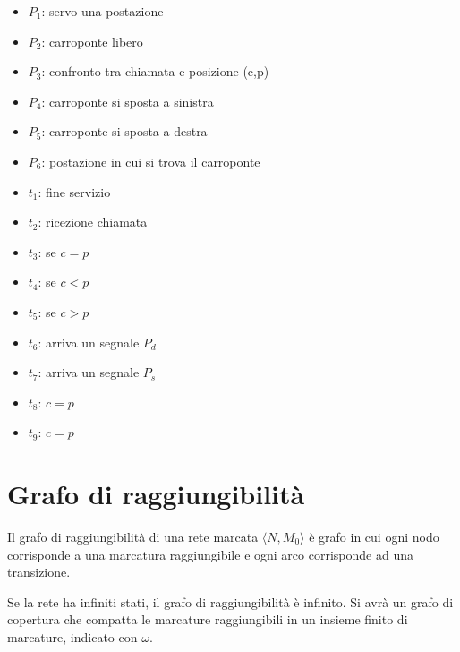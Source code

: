 \documentclass[a4paper]{report}
\begin{document}
\begin{itemize}
\item $P_1$: servo una postazione
\item $P_2$: carroponte libero
\item $P_3$: confronto tra chiamata e posizione (c,p)
\item $P_4$: carroponte si sposta a sinistra
\item $P_5$: carroponte si sposta a destra
\item $P_6$: postazione in cui si trova il carroponte
\item $t_1$: fine servizio
\item $t_2$: ricezione chiamata
\item $t_3$: se $c = p$
\item $t_4$: se $c < p$
\item $t_5$: se $c > p$
\item $t_6$: arriva un segnale $P_d$
\item $t_7$: arriva un segnale $P_s$
\item $t_8$: $c = p$
\item $t_9$: $c = p$
\end{itemize}

\section{Grafo di raggiungibilit\`a}
Il grafo di raggiungibilit\`a di una rete marcata $\langle N, M_0
\rangle$ \`e grafo in cui ogni nodo corrisponde a una marcatura
raggiungibile e ogni arco corrisponde ad una transizione.

Se la rete ha infiniti stati, il grafo di raggiungibilit\`a \`e
infinito. Si avr\`a un grafo di copertura che compatta le marcature
raggiungibili in un insieme finito di marcature, indicato con
$\omega$.
\end{document}
